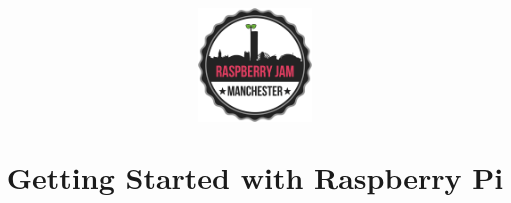 \documentclass[a4paper, twocolumn, twoside, 11pt]{article}
\begin{document}
	
	\author{}
	\title{
		\begin{center}
			\includegraphics[width=30mm]{common/logo-512}
		\end{center}
		\vspace{12pt}
		Getting Started with Raspberry Pi}
		
	\date{}
	\maketitle
	
	
	\setcounter{tocdepth}{1}
	\tableofcontents
	\vspace{12pt}

	
	
	\newpage
	
	\newpage
	
	\newpage
	
\end{document}
